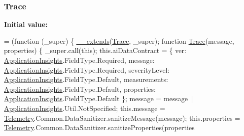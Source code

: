 \subsubsection[{\texorpdfstring{Trace}{Trace}}]{ Trace}\hypertarget{_scripts_2ai_80_822_89-build00167_8js_a3867abf13e2de1973401ad4ea465f38d}{}\label{_scripts_2ai_80_822_89-build00167_8js_a3867abf13e2de1973401ad4ea465f38d}
{\bfseries Initial value\+:}
\begin{DoxyCode}
= (\textcolor{keyword}{function} (\_super) \{
                \hyperlink{obj_2_release_2_package_2_package_tmp_2_scripts_2ai_80_822_89-build00167_8js_ac09f4951ac4b25df0272d4e78ff85ae0}{\_\_extends}(\hyperlink{obj_2_release_2_package_2_package_tmp_2_scripts_2ai_80_822_89-build00167_8js_a3867abf13e2de1973401ad4ea465f38d}{Trace}, \_super);
                \textcolor{keyword}{function} \hyperlink{obj_2_release_2_package_2_package_tmp_2_scripts_2ai_80_822_89-build00167_8js_a3867abf13e2de1973401ad4ea465f38d}{Trace}(message, properties) \{
                    \_super.call(\textcolor{keyword}{this});
                    this.aiDataContract = \{
                        ver: \hyperlink{obj_2_release_2_package_2_package_tmp_2_scripts_2ai_80_822_89-build00167_8js_aa415ef4f8cdd699689ef4b61db7656d8}{ApplicationInsights}.FieldType.Required,
                        message: \hyperlink{obj_2_release_2_package_2_package_tmp_2_scripts_2ai_80_822_89-build00167_8js_aa415ef4f8cdd699689ef4b61db7656d8}{ApplicationInsights}.FieldType.Required,
                        severityLevel: \hyperlink{obj_2_release_2_package_2_package_tmp_2_scripts_2ai_80_822_89-build00167_8js_aa415ef4f8cdd699689ef4b61db7656d8}{ApplicationInsights}.FieldType.Default,
                        measurements: \hyperlink{obj_2_release_2_package_2_package_tmp_2_scripts_2ai_80_822_89-build00167_8js_aa415ef4f8cdd699689ef4b61db7656d8}{ApplicationInsights}.FieldType.Default,
                        properties: \hyperlink{obj_2_release_2_package_2_package_tmp_2_scripts_2ai_80_822_89-build00167_8js_aa415ef4f8cdd699689ef4b61db7656d8}{ApplicationInsights}.FieldType.Default
                    \};
                    message = message || \hyperlink{obj_2_release_2_package_2_package_tmp_2_scripts_2ai_80_822_89-build00167_8js_aa415ef4f8cdd699689ef4b61db7656d8}{ApplicationInsights}.Util.NotSpecified;
                    this.message = \hyperlink{obj_2_release_2_package_2_package_tmp_2_scripts_2ai_80_822_89-build00167_8js_ae256f6f49305d910c46af8e5b9ef950f}{Telemetry}.Common.DataSanitizer.sanitizeMessage(message);
                    this.properties = \hyperlink{obj_2_release_2_package_2_package_tmp_2_scripts_2ai_80_822_89-build00167_8js_ae256f6f49305d910c46af8e5b9ef950f}{Telemetry}.Common.DataSanitizer.sanitizeProperties(properties

\end{DoxyCode}
